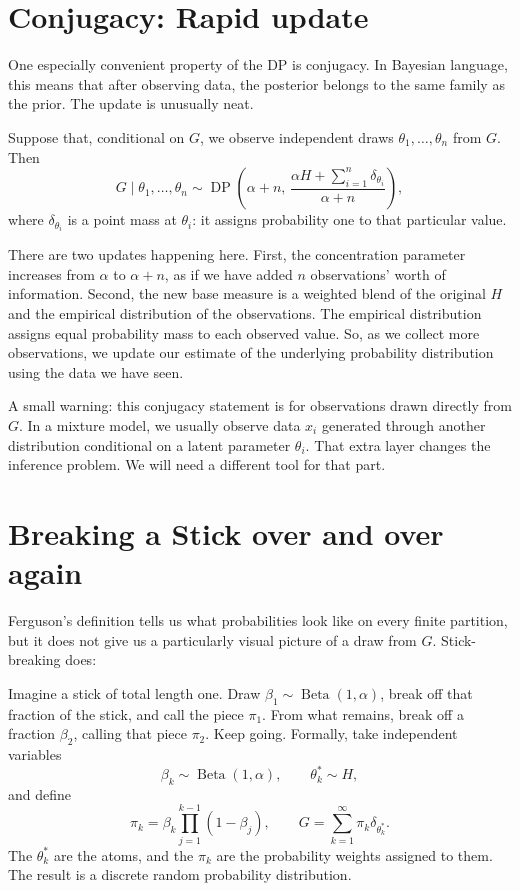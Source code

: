 \documentclass[11pt]{article}
\begin{document}
\section*{Conjugacy: Rapid update}

One especially convenient property of the DP is conjugacy. In Bayesian language, this means that after observing data, the posterior belongs to the same family as the prior. The update is unusually neat.

Suppose that, conditional on \(G\), we observe independent draws
\(\theta_1,\ldots,\theta_n\) from \(G\). Then
\[
G\mid\theta_1,\ldots,\theta_n
\sim
\operatorname{DP}\!\left(
\alpha+n,\,
\frac{\alpha H+\sum_{i=1}^{n}\delta_{\theta_i}}{\alpha+n}
\right),
\]
where \(\delta_{\theta_i}\) is a point mass at \(\theta_i\): it assigns probability one to that particular value.

There are two updates happening here. First, the concentration parameter increases from \(\alpha\) to \(\alpha+n\), as if we have added \(n\) observations' worth of information. Second, the new base measure is a weighted blend of the original \(H\) and the empirical distribution of the observations. The empirical distribution assigns equal probability mass to each observed value. So, as we collect more observations, we update our estimate of the underlying probability distribution using the data we have seen.

A small warning: this conjugacy statement is for observations drawn directly from \(G\). In a mixture model, we usually observe data \(x_i\) generated through another distribution conditional on a latent parameter \(\theta_i\). That extra layer changes the inference problem. We will need a different tool for that part.

\section*{Breaking a Stick over and over again}

Ferguson's definition tells us what probabilities look like on every finite partition, but it does not give us a particularly visual picture of a draw from \(G\). Stick-breaking does:

Imagine a stick of total length one. Draw
\(\beta_1\sim\operatorname{Beta}(1,\alpha)\), break off that fraction of the stick, and call the piece \(\pi_1\). From what remains, break off a fraction \(\beta_2\), calling that piece \(\pi_2\). Keep going. Formally, take independent variables
\[
\beta_k\sim\operatorname{Beta}(1,\alpha),
\qquad
\theta_k^*\sim H,
\]
and define
\[
\pi_k
=
\beta_k\prod_{j=1}^{k-1}(1-\beta_j),
\qquad
G=\sum_{k=1}^{\infty}\pi_k\delta_{\theta_k^*}.
\]
The \(\theta_k^*\) are the atoms, and the \(\pi_k\) are the probability weights assigned to them. The result is a discrete random probability distribution.
\end{document}
